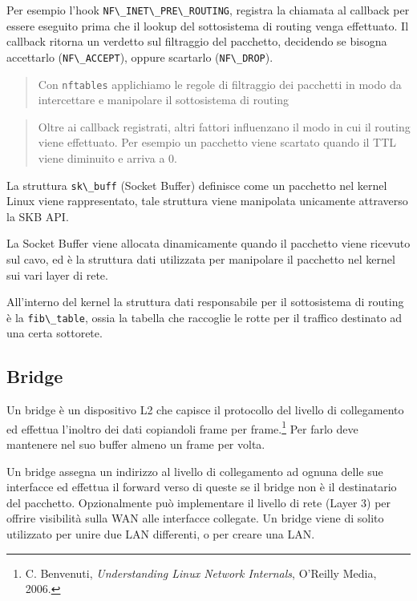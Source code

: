 Per esempio l'hook \passthrough{\lstinline!NF\_INET\_PRE\_ROUTING!},
registra la chiamata al callback per essere eseguito prima che il lookup
del sottosistema di routing venga effettuato. Il callback ritorna un
verdetto sul filtraggio del pacchetto, decidendo se bisogna accettarlo
(\passthrough{\lstinline!NF\_ACCEPT!}), oppure scartarlo
(\passthrough{\lstinline!NF\_DROP!}).

\begin{quote}
Con \passthrough{\lstinline!nftables!} applichiamo le regole di
filtraggio dei pacchetti in modo da intercettare e manipolare il
sottosistema di routing
\end{quote}

\begin{quote}
Oltre ai callback registrati, altri fattori influenzano il modo in cui
il routing viene effettuato. Per esempio un pacchetto viene scartato
quando il TTL viene diminuito e arriva a 0.
\end{quote}

La struttura \passthrough{\lstinline!sk\_buff!} (Socket Buffer)
definisce come un pacchetto nel kernel Linux viene rappresentato, tale
struttura viene manipolata unicamente attraverso la SKB API.

La Socket Buffer viene allocata dinamicamente quando il pacchetto viene
ricevuto sul cavo, ed è la struttura dati utilizzata per manipolare il
pacchetto nel kernel sui vari layer di rete.

All'interno del kernel la struttura dati responsabile per il
sottosistema di routing è la \passthrough{\lstinline!fib\_table!}, ossia
la tabella che raccoglie le rotte per il traffico destinato ad una certa
sottorete.

\subsection{Bridge}\label{bridge}

Un bridge è un dispositivo L2 che capisce il protocollo del livello di
collegamento ed effettua l'inoltro dei dati copiandoli frame per
frame.\footnote{\label{fn:ref_24}C. Benvenuti, \emph{Understanding Linux Network
  Internals}, O'Reilly Media, 2006.} Per farlo deve mantenere nel suo
buffer almeno un frame per volta.

Un bridge assegna un indirizzo al livello di collegamento ad ognuna
delle sue interfacce ed effettua il forward verso di queste se il bridge
non è il destinatario del pacchetto. Opzionalmente può implementare il
livello di rete (Layer 3) per offrire visibilità sulla WAN alle
interfacce collegate. Un bridge viene di solito utilizzato per unire due
LAN differenti, o per creare una LAN.

